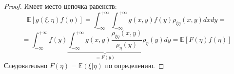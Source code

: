\begin{proof}
Имеет место цепочка равенств:
\[
    \mathbb{E} \left[g\left(\xi, \eta\right) f\left(\eta\right)\right] = \int_{-\infty}^{+\infty} \int_{-\infty}^{+\infty} g\left(x, y\right) f\left(y\right) \rho_{\xi \eta}\left(x, y\right) dx dy  = \]
    \[
    = \int_{-\infty}^{+\infty} f\left(y\right) \underbrace{\int_{-\infty}^{+\infty}g\left(x, y\right)\frac{\rho_{\xi \eta}\left(x, y\right)}{\rho_{\eta}\left(y\right)}}_{= F\left(y\right)} \rho_{\eta}\left(y\right) dy = \mathbb{E} \left[F\left(\eta\right) f\left(\eta\right)\right]
\]
Следовательно $F\left(\eta\right) = \mathbb{E} \left(\xi | \eta\right)$ по определению.
\end{proof}

